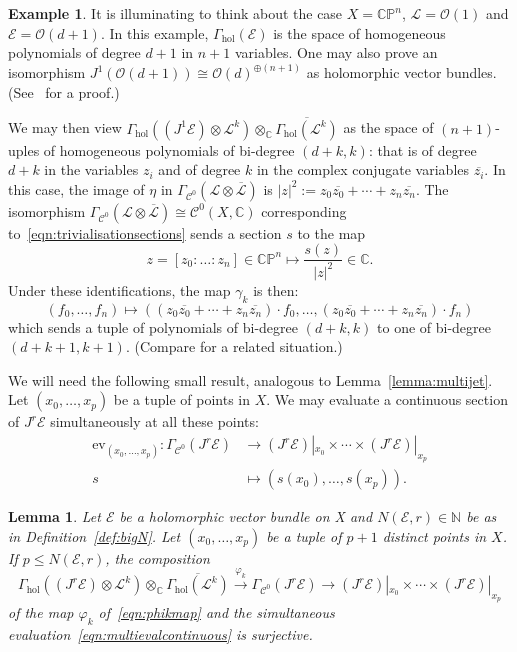\documentclass[a4paper]{amsart}
\newcommand{\bN}{\mathbb N}
\newcommand{\bC}{\mathbb C}
\newcommand{\bP}{\mathbb P}
\newcommand{\cE}{\mathcal E}
\newcommand{\cC}{\mathcal C}
\newcommand{\cL}{\mathcal L}
\newcommand{\cO}{\mathcal O}
\newcommand{\lra}{\longrightarrow}
\theoremstyle{plain}
\newtheorem{lemma}[theorem]{Lemma}
\theoremstyle{definition}
\newtheorem{example}[theorem]{Example}
\newcommand{\Gammahol}{\Gamma_{\mathrm{hol}}}
\begin{document}
\begin{example}\label{example:antihomogeneous_stabilisation}
It is illuminating to think about the case $X = \bC\bP^n$, $\cL = \cO(1)$ and $\cE = \cO(d+1)$. In this example, $\Gammahol(\cE)$ is the space of homogeneous polynomials of degree $d+1$ in $n+1$ variables. One may also prove an isomorphism $J^1(\cO(d+1)) \cong \cO(d)^{\oplus (n+1)}$ as holomorphic vector bundles. (See~\cite[Proposition 2.2]{di_rocco_line_2000} for a proof.)

We may then view $\Gammahol\left( (J^1\cE) \otimes \cL^k \right) \otimes_\bC \overline{\Gammahol\left(\cL^k \right)}$ as the space of $(n+1)$-uples of homogeneous polynomials of bi-degree $(d+k,k)$: that is of degree $d+k$ in the variables $z_i$ and of degree $k$ in the complex conjugate variables $\overline{z_i}$. In this case, the image of $\eta$ in $\Gamma_{\cC^0}\left(\cL \otimes \overline{\cL}\right)$ is $|z|^2 := z_0 \overline{z_0} + \cdots + z_n \overline{z_n}$. The isomorphism $\Gamma_{\cC^0}\left(\cL \otimes \overline{\cL}\right) \cong \cC^0(X,\bC)$ corresponding to~\eqref{eqn:trivialisationsections} sends a section $s$ to the map
\[
    z = [z_0:\ldots:z_n] \in \bC\bP^n \longmapsto \frac{s(z)}{|z|^2} \in \bC.
\]
Under these identifications, the map $\gamma_k$ is then:
\[
    \left( f_0, \ldots, f_n \right) \longmapsto \left( (z_0\overline{z_0} + \cdots + z_n\overline{z_n})\cdot f_0, \ldots, (z_0\overline{z_0} + \cdots + z_n\overline{z_n})\cdot f_n \right)
\]
which sends a tuple of polynomials of bi-degree $(d+k,k)$ to one of bi-degree $(d+k+1,k+1)$. (Compare \cite{mostovoy_spaces_2006} for a related situation.)
\end{example}


\bigskip

We will need the following small result, analogous to Lemma~\ref{lemma:multijet}. Let $(x_0, \ldots, x_p)$ be a tuple of points in $X$. We may evaluate a continuous section of $J^r\cE$ simultaneously at all these points:
\begin{equation}\label{eqn:multievalcontinuous}
\begin{split}
    \mathrm{ev}_{(x_0,\ldots,x_p)} \colon \Gamma_{\cC^0}\left( J^r\cE \right) &\lra (J^r\cE)|_{x_0} \times \cdots \times (J^r\cE)|_{x_p} \\
            s &\longmapsto \left( s(x_0), \ldots, s(x_p)\right).
\end{split}
\end{equation}
\begin{lemma}\label{lemma:multieval}
Let $\cE$ be a holomorphic vector bundle on X and $N(\cE,r) \in \bN$ be as in Definition~\ref{def:bigN}. Let $(x_0, \ldots, x_p)$ be a tuple of $p+1$ distinct points in $X$. If $p \leq N(\cE,r)$, the composition
\[
    \Gammahol\left( (J^r\cE) \otimes \cL^k \right) \otimes_\bC \overline{\Gammahol\left(\cL^k \right)} \overset{\varphi_k}{\lra} \Gamma_{\cC^0}\left( J^r\cE \right) \lra (J^r\cE)|_{x_0} \times \cdots \times (J^r\cE)|_{x_p}
\]
of the map $\varphi_k$ of~\eqref{eqn:phikmap} and the simultaneous evaluation~\eqref{eqn:multievalcontinuous} is surjective.
\end{lemma}
\end{document}
